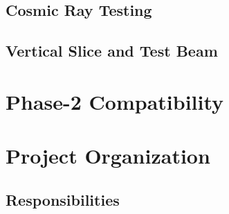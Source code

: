 \documentclass[USenglish]{latex/atlasdoc}
\begin{document}
\subsection{Cosmic Ray Testing}
\label{sec:testing-cosmics}

\subsection{Vertical Slice and Test Beam}
\label{sec:testing-vertical-slice}


\section{Phase-2 Compatibility}
\label{sec:phase2}


\section{Project Organization}
\label{sec:organization}

\subsection{Responsibilities}
\label{sec:responsibilities}

%


\FloatBarrier


\end{document}
